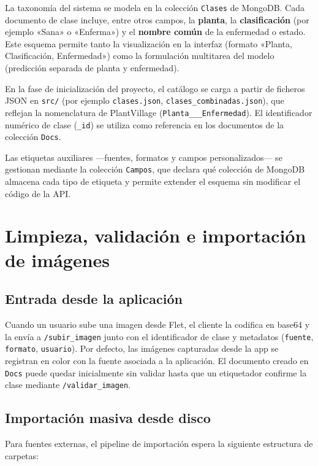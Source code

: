 \documentclass[11pt,spanish,listoffigures,listoftables]{tfgetsinf}
\begin{document}
La taxonomía del sistema se modela en la colección \texttt{Clases} de MongoDB. Cada documento de clase incluye, entre otros campos, la \textbf{planta}, la \textbf{clasificación} (por ejemplo «Sana» o «Enferma») y el \textbf{nombre común} de la enfermedad o estado. Este esquema permite tanto la visualización en la interfaz (formato «Planta, Clasificación, Enfermedad») como la formulación multitarea del modelo (predicción separada de planta y enfermedad).

En la fase de inicialización del proyecto, el catálogo se carga a partir de ficheros JSON en \texttt{src/} (por ejemplo \texttt{clases.json}, \texttt{clases\_combinadas.json}), que reflejan la nomenclatura de PlantVillage (\texttt{Planta\_\_\_Enfermedad}). El identificador numérico de clase (\texttt{\_id}) se utiliza como referencia en los documentos de la colección \texttt{Docs}.

Las etiquetas auxiliares ---fuentes, formatos y campos personalizados--- se gestionan mediante la colección \texttt{Campos}, que declara qué colección de MongoDB almacena cada tipo de etiqueta y permite extender el esquema sin modificar el código de la API.

\section{Limpieza, validación e importación de imágenes}

\subsection{Entrada desde la aplicación}

Cuando un usuario sube una imagen desde Flet, el cliente la codifica en base64 y la envía a \texttt{/subir\_imagen} junto con el identificador de clase y metadatos (\texttt{fuente}, \texttt{formato}, \texttt{usuario}). Por defecto, las imágenes capturadas desde la app se registran en color con la fuente asociada a la aplicación. El documento creado en \texttt{Docs} puede quedar inicialmente sin validar hasta que un etiquetador confirme la clase mediante \texttt{/validar\_imagen}.

\subsection{Importación masiva desde disco}

Para fuentes externas, el pipeline de importación espera la siguiente estructura de carpetas:
\end{document}

